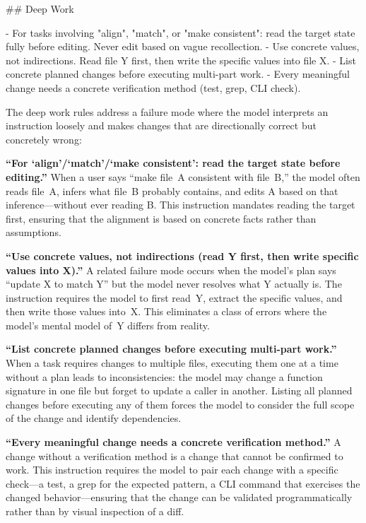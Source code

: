 \documentclass{article}
\begin{document}
\begin{prompt}
## Deep Work

- For tasks involving "align", "match", or "make
  consistent": read the target state fully before
  editing. Never edit based on vague recollection.
- Use concrete values, not indirections. Read file Y
  first, then write the specific values into file X.
- List concrete planned changes before executing
  multi-part work.
- Every meaningful change needs a concrete verification
  method (test, grep, CLI check).
\end{prompt}

\noindent The deep work rules address a failure mode where the model interprets an instruction loosely and makes changes that are directionally correct but concretely wrong:

\textbf{``For `align'/`match'/`make consistent': read the target state before editing.''}  When a user says ``make file~A consistent with file~B,'' the model often reads file~A, infers what file~B probably contains, and edits A based on that inference---without ever reading B.  This instruction mandates reading the target first, ensuring that the alignment is based on concrete facts rather than assumptions.

\textbf{``Use concrete values, not indirections (read Y first, then write specific values into X).''}  A related failure mode occurs when the model's plan says ``update X to match Y'' but the model never resolves what Y actually is.  The instruction requires the model to first read~Y, extract the specific values, and then write those values into~X.  This eliminates a class of errors where the model's mental model of~Y differs from reality.

\textbf{``List concrete planned changes before executing multi-part work.''}  When a task requires changes to multiple files, executing them one at a time without a plan leads to inconsistencies: the model may change a function signature in one file but forget to update a caller in another.  Listing all planned changes before executing any of them forces the model to consider the full scope of the change and identify dependencies.

\textbf{``Every meaningful change needs a concrete verification method.''}  A change without a verification method is a change that cannot be confirmed to work.  This instruction requires the model to pair each change with a specific check---a test, a grep for the expected pattern, a CLI command that exercises the changed behavior---ensuring that the change can be validated programmatically rather than by visual inspection of a diff.
\end{document}
